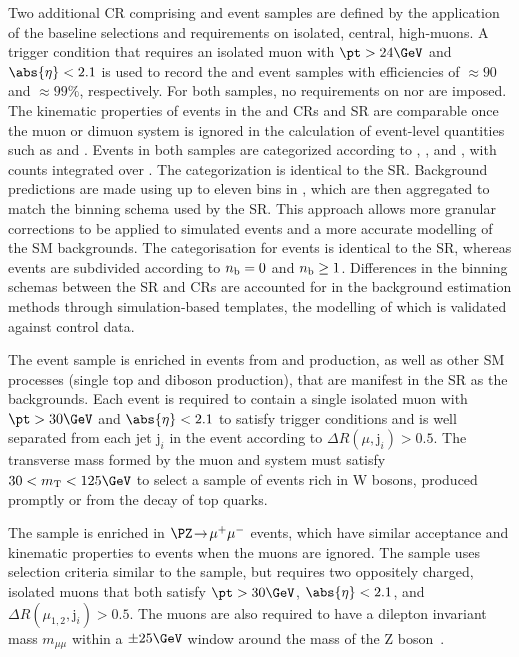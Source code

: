 Two additional CR comprising \mj and \mmj event samples are defined by
the application of the baseline selections and requirements on
isolated, central, high-\pt muons. A trigger condition that requires
an isolated muon with $\pt > 24\GeV$ and $\abs{\eta} < 2.1$ is used to
record the \mj and \mmj event samples with efficiencies of
${\approx}90$ and ${\approx}99\%$, respectively. For both samples, no
requirements on \alphat nor \bdphi are imposed. The kinematic
properties of events in the \mj and \mmj CRs and SR are comparable
once the muon or dimuon system is ignored in the calculation of
event-level quantities such as \scalht and \mht.  Events in both
samples are categorized according to \njet, \scalht, and \nb, with
counts integrated over \mht. The \njet categorization is identical to
the SR. Background predictions are made using up to eleven bins in
\scalht, which are then aggregated to match the \scalht binning schema
used by the SR. This approach allows more granular corrections to be
applied to simulated events and a more accurate modelling of the SM
backgrounds. The \nb categorisation for \mj events is identical to the
SR, whereas \mmj events are subdivided according to $n_{\text{b}} = 0$ and $n_{\text{b}}
\geq 1$. Differences in the binning schemas between the SR and CRs are
accounted for in the background estimation methods through
simulation-based templates, the modelling of which is validated
against control data.

The \mj event sample is enriched in events from \wmj and \ttbar
production, as well as other SM processes (\eg single top and diboson
production), that are manifest in the SR as the \lost
backgrounds. Each event is required to contain a single isolated muon
with $\pt > 30\GeV$ and $\abs{\eta} < 2.1$ to satisfy trigger
conditions and is well separated from each jet $\text{j}_i$ in the
event according to ${\Delta}R(\mu,\text{j}_i) > 0.5$. The transverse
mass formed by the muon \pt and \ptvecmiss system must satisfy $30 <
m_\text{T} < 125\GeV$ to select a sample of events rich in W bosons,
produced promptly or from the decay of top quarks.

The \mmj sample is enriched in $\PZ\! \rightarrow\!  \mu^+\mu^-$
events, which have similar acceptance and kinematic properties to
\znunuj events when the muons are ignored. The sample uses selection
criteria similar to the \mj sample, but requires two oppositely
charged, isolated muons that both satisfy $\pt > 30\GeV$, $\abs{\eta}
< 2.1$, and ${\Delta}R(\mu_{1,2},\text{j}_i) > 0.5$. The muons are
also required to have a dilepton invariant mass $m_{\mu\mu}$ within a
${\pm}25\GeV$ window around the mass of the Z
boson~\cite{1674-1137-38-9-090001}.

